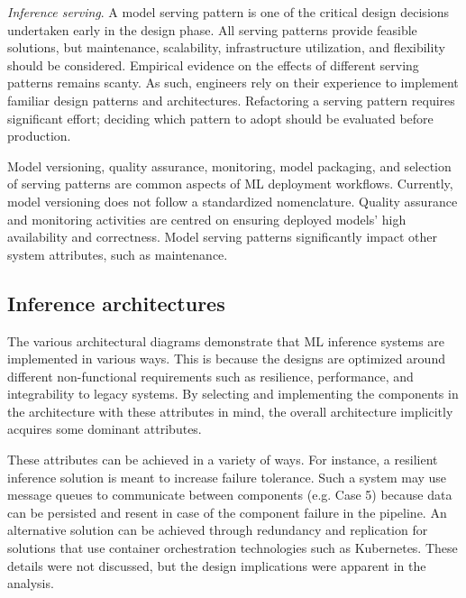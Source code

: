 \textit{Inference serving}. A model serving pattern is one of the critical design decisions undertaken early in the design phase. All serving patterns provide feasible solutions, but maintenance, scalability, infrastructure utilization, and flexibility should be considered. Empirical evidence on the effects of different serving patterns remains scanty. As such, engineers rely on their experience to implement familiar design patterns and architectures. Refactoring a serving pattern requires significant effort; deciding which pattern to adopt should be evaluated before production.

\begin{tcolorbox}[colback=white!73!white,colframe=gray!90!gray]
 Model versioning, quality assurance, monitoring, model packaging, and selection of serving patterns are common aspects of ML deployment workflows. Currently, model versioning does not follow a standardized nomenclature. Quality assurance and monitoring activities are centred on ensuring deployed models' high availability and correctness. Model serving patterns significantly impact other system attributes, such as maintenance.
\end{tcolorbox}

\subsection{Inference architectures}
The various architectural diagrams demonstrate that ML inference systems are implemented in various ways. This is because the designs are optimized around different non-functional requirements such as resilience, performance, and integrability to legacy systems. By selecting and implementing the components in the architecture with these attributes in mind, the overall architecture implicitly acquires some dominant attributes.

These attributes can be achieved in a variety of ways. For instance, a resilient inference solution is meant to increase failure tolerance. Such a system may use message queues to communicate between components (e.g. Case 5) because data can be persisted and resent in case of the component failure in the pipeline. An alternative solution can be achieved through redundancy and replication for solutions that use container orchestration technologies such as Kubernetes. These details were not discussed, but the design implications were apparent in the analysis.

